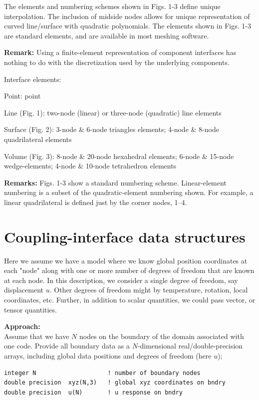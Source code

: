 \documentclass[11pt]{article}
\begin{document}
The elements and numbering schemes shown in Figs. 1-3 define unique
interpolation.  The inclusion of midside nodes allows for unique
representation of curved line/surface with quadratic polynomials.  The
elements shown in Figs. 1-3 are standard elements, and are available in most
meshing software.


\textbf{Remark:} Using a finite-element representation of component
interfaces has nothing to do with the discretization used by the underlying
components.

Interface elements:

Point: point

Line (Fig. 1): two-node (linear) or three-node (quadratic) line elements

Surface (Fig. 2): 3-node \& 6-node triangles elements; 4-node \& 8-node 
quadrilateral elements

Volume (Fig. 3): 8-node \& 20-node hexahedral elements;  
6-node \& 15-node wedge-elements;
4-node \& 10-node tetrahedron elements

\textbf{Remarks:} Figs. 1-3 show a standard numbering scheme. Linear-element 
numbering is a subset of the quadratic-element numbering shown.  For
example, a linear quadrilateral is defined just by the corner nodes, 1--4.

\section{Coupling-interface data structures}

Here we assume we have a model where we know global position coordinates at
each "node" along with one or more number of degrees of freedom that are
known at each node.   In this description, we consider a single degree of
freedom, say displacement $u$.  Other degrees of freedom might by
temperature, rotation, local coordinates, etc.  Further, in addition to
scalar quantities, we could pass  vector, or tensor quantities.

\textbf{Approach:}\\
Assume that we have $N$ nodes on the boundary of the domain associated with
one code.  
Provide all boundary data as a $N$-dimensional real/double-precision arrays,
including global data positions and degrees of freedom (here $u$); 
\begin{verbatim}
integer N                    ! number of boundary nodes
double precision  xyz(N,3)   ! global xyz coordinates on bndry
double precision  u(N)       ! u response on bndry
\end{verbatim}
\end{document}
